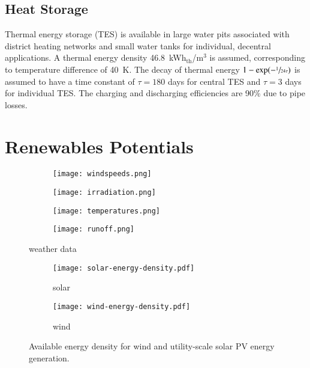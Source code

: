 
\subsection{Heat Storage}
\label{sec:si:heat:storage}

Thermal energy storage (TES) is available in large water pits associated with
district heating networks and small water tanks for individual, decentral
applications. A thermal energy density 46.8~kWh$_{\text{th}}$/m$^3$ is assumed,
corresponding to temperature difference of \SI{40}{\kelvin}. The decay of
thermal energy $1-\exp(-\sfrac{1}{24\tau})$ is assumed to have a time constant
of $\tau=180$ days for central TES and $\tau=3$ days for individual TES. The
charging and discharging efficiencies are 90\% due to pipe losses.

\section{Renewables Potentials}

\begin{figure}
    \centering
        \begin{subfigure}[t]{0.49\textwidth}
            \centering
        \texttt{[image: windspeeds.png]}
    \end{subfigure}
    \begin{subfigure}[t]{0.49\textwidth}
        \centering
        \texttt{[image: irradiation.png]}
    \end{subfigure}
    \begin{subfigure}[t]{0.49\textwidth}
        \centering
        \texttt{[image: temperatures.png]}
    \end{subfigure}
    \begin{subfigure}[t]{0.49\textwidth}
        \centering
        \texttt{[image: runoff.png]}
    \end{subfigure}
    \caption{weather data}
    \label{fig:weather-data}
\end{figure}


\begin{figure}
    \centering
    \begin{subfigure}[t]{0.49\textwidth}
        \centering
        \caption{solar}
        \texttt{[image: solar-energy-density.pdf]}
    \end{subfigure}
    \begin{subfigure}[t]{0.49\textwidth}
        \centering
        \caption{wind}
        \texttt{[image: wind-energy-density.pdf]}
    \end{subfigure}
    \caption{Available energy density for wind and utility-scale solar PV energy generation.}
    \label{fig:energy-density}
\end{figure}

